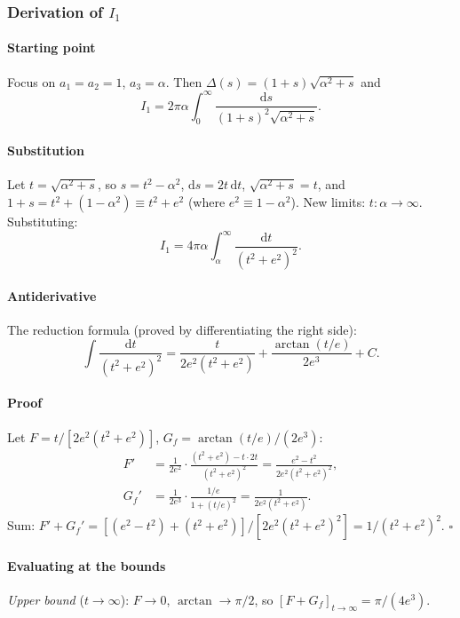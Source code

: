 \documentclass[3p]{elsarticle}
\begin{document}
\subsubsection{Derivation of $I_1$}
\label{sec:I1}

\paragraph{Starting point}
Focus on $a_1=a_2=1$, $a_3=\alpha$. Then
$\Delta(s)=(1+s)\sqrt{\alpha^2+s}$ and
\begin{equation}
  I_1=2\pi\alpha\int_0^\infty\frac{\mathrm ds}
  {(1+s)^2\sqrt{\alpha^2+s}}.
  \label{eq:I1start}
\end{equation}

\paragraph{Substitution}
Let $t=\sqrt{\alpha^2+s}$, so $s=t^2-\alpha^2$, $\mathrm ds=2t\,\mathrm dt$,
$\sqrt{\alpha^2+s}=t$, and $1+s=t^2+(1-\alpha^2)\equiv t^2+e^2$
(where $e^2\equiv1-\alpha^2$). New limits: $t:\alpha\to\infty$.
Substituting:
\begin{equation}
  I_1=4\pi\alpha\int_\alpha^\infty\frac{\mathrm dt}{(t^2+e^2)^2}.
  \label{eq:I1sub}
\end{equation}

\paragraph{Antiderivative}
The reduction formula (proved by differentiating the right side):
\begin{equation}
  \int\frac{\mathrm dt}{(t^2+e^2)^2}=
  \frac{t}{2e^2(t^2+e^2)}+\frac{\arctan(t/e)}{2e^3}+C.
  \label{eq:antideriv}
\end{equation}
\paragraph{Proof} Let $F=t/[2e^2(t^2{+}e^2)]$,
$G_f=\arctan(t/e)/(2e^3)$:
\begin{align*}
  F'&=\frac{1}{2e^2}\cdot\frac{(t^2+e^2)-t\cdot2t}{(t^2+e^2)^2}
    =\frac{e^2-t^2}{2e^2(t^2+e^2)^2},\\
  G_f'&=\frac{1}{2e^3}\cdot\frac{1/e}{1+(t/e)^2}
    =\frac{1}{2e^2(t^2+e^2)}.
\end{align*}
Sum: $F'+G_f'=[(e^2-t^2)+(t^2+e^2)]/[2e^2(t^2+e^2)^2]
=1/(t^2+e^2)^2$. $\square$

\paragraph{Evaluating at the bounds}
\textit{Upper bound} ($t\to\infty$): $F\to0$, $\arctan\to\pi/2$, so
$[F+G_f]_{t\to\infty}=\pi/(4e^3)$.
\end{document}
